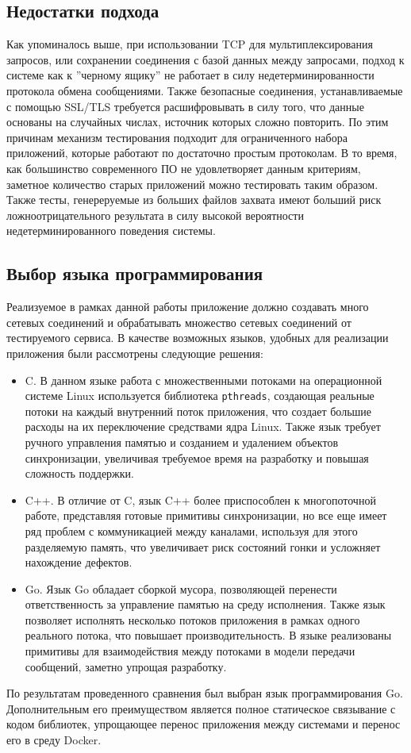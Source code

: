 \subsection{Недостатки подхода}
Как упоминалось выше, при использовании TCP для мультиплексирования запросов,
или сохранении соединения с базой данных между запросами, подход к системе как
к ''черному ящику'' не работает в силу недетерминированности протокола обмена
сообщениями. Также безопасные соединения, устанавливаемые с помощью SSL/TLS
требуется расшифровывать в силу того, что данные основаны на случайных числах,
источник которых сложно повторить. По этим причинам механизм тестирования
подходит для ограниченного набора приложений, которые работают по достаточно
простым протоколам. В то время, как большинство современного ПО не
удовлетворяет данным критериям, заметное количество старых приложений можно
тестировать таким образом. Также тесты, генереруемые из больших файлов
захвата имеют больший риск ложноотрицательного результата в силу высокой
вероятности недетерминированного поведения системы.


\subsection{Выбор языка программирования}
Реализуемое в рамках данной работы приложение должно создавать много сетевых
соединений и обрабатывать множество сетевых соединений от тестируемого
сервиса. В качестве возможных языков, удобных для реализации приложения были
рассмотрены следующие решения:
\begin{itemize}
    \item C. В данном языке работа с множественными потоками на операционной
        системе Linux используется библиотека \lstinline{pthreads}, создающая
        реальные потоки на каждый внутренний поток приложения, что создает
        большие расходы на их переключение средствами ядра Linux. Также язык
        требует ручного управления памятью и созданием и удалением объектов
        синхронизации, увеличивая требуемое время на разработку и повышая
        сложность поддержки.  
    \item C++. В отличие от C, язык C++ более приспособлен к многопоточной
        работе, представляя готовые примитивы синхронизации, но все еще имеет
        ряд проблем с коммуникацией между каналами, используя для этого
        разделяемую память, что увеличивает риск состояний гонки и усложняет
        нахождение дефектов.  
    \item Go. Язык Go обладает сборкой мусора, позволяющей перенести
        ответственность за управление памятью на среду исполнения. Также язык
        позволяет исполнять несколько потоков приложения в рамках одного
        реального потока, что повышает производительность. В языке реализованы
        примитивы для взаимодействия между потоками в модели передачи сообщений,
        заметно упрощая разработку.  
\end{itemize}
По результатам проведенного сравнения был выбран язык программирования Go.
Дополнительным его преимуществом является полное статическое связывание с
кодом библиотек, упрощающее перенос приложения между системами и перенос его в
среду Docker.
\pagebreak

